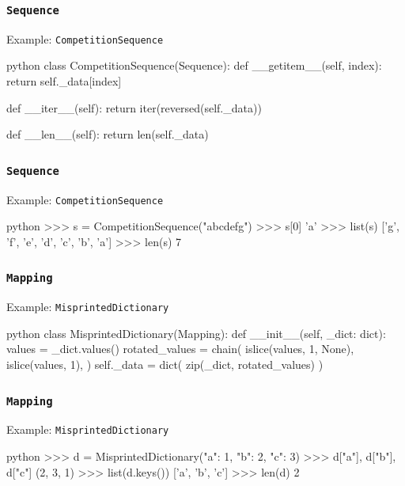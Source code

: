 \documentclass[aspectratio=169,dvipdfmx,12pt,notheorems]{beamer}
\theoremstyle{definition}
\begin{document}
\begin{frame}[fragile]\frametitle{\texttt{Sequence}}

\begin{exampleblock}{Example: \texttt{CompetitionSequence}}
\begin{pygments}{python}
class CompetitionSequence(Sequence):
    def __getitem__(self, index):
        return self._data[index]

    def __iter__(self):
        return iter(reversed(self._data))

    def __len__(self):
        return len(self._data)
\end{pygments}
\end{exampleblock}

\end{frame}

\begin{frame}[fragile]\frametitle{\texttt{Sequence}}

\begin{exampleblock}{Example: \texttt{CompetitionSequence}}
\begin{pygments}{python}
>>> s = CompetitionSequence("abcdefg")
>>> s[0]
'a'
>>> list(s)
['g', 'f', 'e', 'd', 'c', 'b', 'a']
>>> len(s)
7
\end{pygments}
\end{exampleblock}

\end{frame}

\begin{frame}[fragile]\frametitle{\texttt{Mapping}}

\begin{exampleblock}{Example: \texttt{MisprintedDictionary}}
\begin{pygments}{python}
class MisprintedDictionary(Mapping):
    def __init__(self, _dict: dict):
        values = _dict.values()
        rotated_values = chain(
            islice(values, 1, None),
            islice(values, 1),
        )
        self._data = dict(
            zip(_dict, rotated_values)
        )
\end{pygments}
\end{exampleblock}

\end{frame}

\begin{frame}[fragile]\frametitle{\texttt{Mapping}}

\begin{exampleblock}{Example: \texttt{MisprintedDictionary}}
\begin{pygments}{python}
>>> d = MisprintedDictionary({"a": 1, "b": 2, "c": 3})
>>> d["a"], d["b"], d["c"]
(2, 3, 1)
>>> list(d.keys())
['a', 'b', 'c']
>>> len(d)
2
\end{pygments}
\end{exampleblock}

\end{frame}
\end{document}
